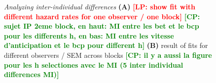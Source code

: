 \documentclass[12pt,english]{article}%
\newcommand{\seeFig}[1]{Figure~\ref{fig:#1}}
\newcommand{\LP}[1]{\textbf{\textcolor{red}{[LP: #1]}}}
\newcommand{\CP}[1]{\textbf{\textcolor{green}{[CP: #1]}}}
\begin{document}
\begin{figure}%


%
\caption{\emph{Analyzing inter-individual differences}
\textbf{(A)}
\LP{ show fit with different hazard rates for one observer / one block}
\CP{sujet IP 2eme block,  en haut: MI entre les bet et le bcp pour les differents h, en bas: MI entre les vitesse d'anticipation et le bcp pour different h}
\textbf{(B)}
result of fits for different observers / SEM across blocks
\CP{il y a aussi la figure pour les h selectiones avec le MI (5 inter individual differences MI)}
}
\label{fig:results_inter}
\end{figure}
\end{document}
